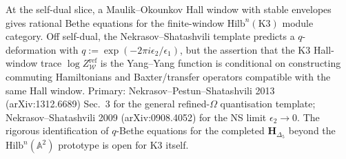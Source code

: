 \begin{remark}
\label{rem:v2-oackd-qbethe-nonselfdual}
At the self-dual slice, a Maulik--Okounkov Hall window with stable
envelopes gives rational Bethe equations for the finite-window
$\mathrm{Hilb}^n(\mathrm{K3})$ module category.  Off self-dual, the
Nekrasov--Shatashvili template predicts a $q$-deformation with
$q:=\exp(-2\pi i\epsilon_2/\epsilon_1)$, but the assertion that the
K3 Hall-window trace $\log Z^{\mathrm{ref}}_{\mathcal W}$ is the
Yang--Yang function is conditional on constructing commuting
Hamiltonians and Baxter/transfer operators compatible with the same
Hall window. Primary:
Nekrasov--Pestun--Shatashvili 2013 (arXiv:1312.6689) Sec.~3 for the
general refined-$\Omega$ quantisation template;
Nekrasov--Shatashvili 2009 (arXiv:0908.4052) for the NS limit $\epsilon_2 \to 0$.
The rigorous identification of $q$-Bethe equations for the completed
$\mathbf H_{\Delta_5}$ beyond the $\mathrm{Hilb}^n(\mathbb A^2)$
prototype is open for K3 itself.
\end{remark}

